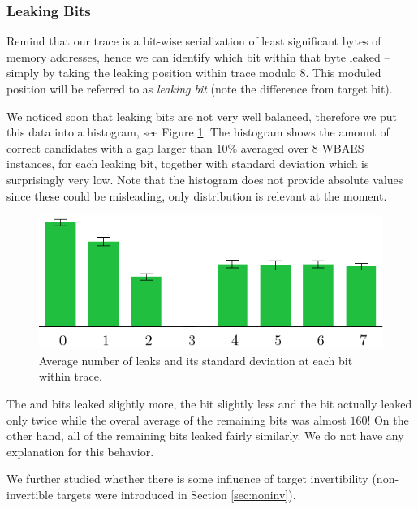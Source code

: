 \subsubsection{Leaking Bits}
	
	Remind that our trace is a bit-wise serialization of least significant bytes of memory addresses, hence we can identify which bit within that byte leaked -- simply by taking the leaking position within trace modulo $8$. This moduled position will be referred to as {\em leaking bit} (note the difference from target bit).
	
	We noticed soon that leaking bits are not very well balanced, therefore we put this data into a histogram, see Figure \ref{fig:leakbitall}. The histogram shows the amount of correct candidates with a gap larger than $10\%$ averaged over $8$ WBAES instances, for each leaking bit, together with standard deviation which is surprisingly very low. Note that the histogram does not provide absolute values since these could be misleading, only distribution is relevant at the moment.
	
	\begin{figure}[h]
	\begin{center}
		\includegraphics{figures/leak_bit/leak_bit.pdf}
		\caption{Average number of leaks and its standard deviation at each bit within trace.}
		\label{fig:leakbitall}
	\end{center}
	\end{figure}
	
	The  and  bits leaked slightly more, the  bit slightly less and the  bit actually leaked only twice while the overal average of the remaining bits was almost $160$! On the other hand, all of the remaining bits leaked fairly similarly. We do not have any explanation for this behavior.
	
	We further studied whether there is some influence of target invertibility (non-invertible targets were introduced in Section \ref{sec:noninv}).
	
